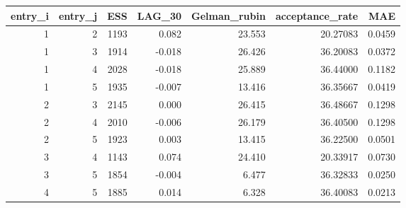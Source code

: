 \begin{longtable}{rrrrrrr}
\toprule
entry\_i & entry\_j & ESS & LAG\_30 & Gelman\_rubin & acceptance\_rate & MAE \\ 
\midrule
1 & 2 & 1193 & 0.082 & 23.553 & 20.27083 & 0.0459 \\ 
1 & 3 & 1914 & -0.018 & 26.426 & 36.20083 & 0.0372 \\ 
1 & 4 & 2028 & -0.018 & 25.889 & 36.44000 & 0.1182 \\ 
1 & 5 & 1935 & -0.007 & 13.416 & 36.35667 & 0.0419 \\ 
2 & 3 & 2145 & 0.000 & 26.415 & 36.48667 & 0.1298 \\ 
2 & 4 & 2010 & -0.006 & 26.179 & 36.40500 & 0.1298 \\ 
2 & 5 & 1923 & 0.003 & 13.415 & 36.22500 & 0.0501 \\ 
3 & 4 & 1143 & 0.074 & 24.410 & 20.33917 & 0.0730 \\ 
3 & 5 & 1854 & -0.004 & 6.477 & 36.32833 & 0.0250 \\ 
4 & 5 & 1885 & 0.014 & 6.328 & 36.40083 & 0.0213 \\ 
\bottomrule
\end{longtable}

